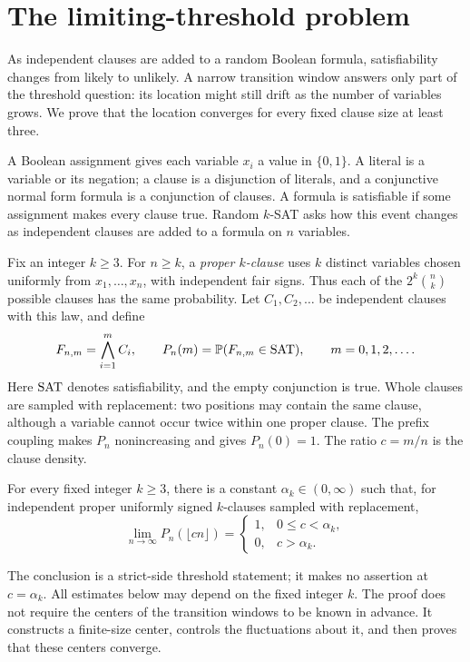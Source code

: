 \section{The limiting-threshold problem}\label{sec:intro}

As independent clauses are added to a random Boolean formula,
satisfiability changes from likely to unlikely. A narrow transition
window answers only part of the threshold question: its location might
still drift as the number of variables grows. We prove that the location
converges for every fixed clause size at least three.

A Boolean assignment gives each variable \(x_i\) a value in \(\{0,1\}\).
A literal is a variable or its negation; a clause is a disjunction of
literals, and a conjunctive normal form formula is a conjunction of
clauses. A formula is satisfiable if some assignment makes every clause
true. Random \(k\)-SAT asks how this event changes as independent clauses
are added to a formula on \(n\) variables.

Fix an integer \(k\ge3\). For \(n\ge k\), a \emph{proper \(k\)-clause}
uses \(k\) distinct variables chosen uniformly from \(x_1,\ldots,x_n\),
with independent fair signs. Thus each of the \(2^k\binom nk\) possible
clauses has the same probability. Let \(C_1,C_2,\ldots\) be independent
clauses with this law, and define
\[
 F_{n,m}=\bigwedge_{i=1}^{m}C_i,
 \qquad P_n(m)=\mathbb P(F_{n,m}\in\mathrm{SAT}),\qquad m=0,1,2,\ldots.
\]
Here \(\mathrm{SAT}\) denotes satisfiability, and the empty conjunction is true.
Whole clauses are sampled with replacement: two positions may contain
the same clause, although a variable cannot occur twice within one
proper clause. The prefix coupling makes \(P_n\) nonincreasing and gives
\(P_n(0)=1\). The ratio \(c=m/n\) is the clause density.

\begin{theorem}\label{thm:main}
For every fixed integer \(k\ge3\), there is a constant
\(\alpha_k\in(0,\infty)\) such that, for independent proper uniformly
signed \(k\)-clauses sampled with replacement,
\[
 \lim_{n\to\infty}P_n(\lfloor cn\rfloor)
 =
 \begin{cases}
  1,&0\le c<\alpha_k,\\
  0,&c>\alpha_k.
 \end{cases}
\]
\end{theorem}

The conclusion is a strict-side threshold statement; it makes no
assertion at \(c=\alpha_k\). All estimates below may depend on the fixed
integer \(k\). The proof does not require the centers of the transition
windows to be known in advance. It constructs a finite-size center,
controls the fluctuations about it, and then proves that these centers
converge.

